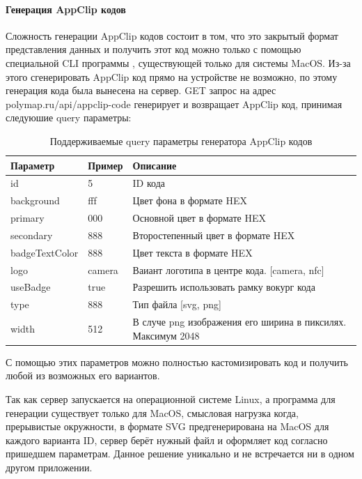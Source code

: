     \paragraph{Генерация AppClip кодов}
      Сложность генерации AppClip кодов состоит в том, что это закрытый формат представления данных и получить этот код можно только с помощью специальной CLI программы \cite{AppClipGenerator}, существующей только для системы MacOS. Из-за этого сгенерировать AppClip код прямо на устройстве не возможно, по этому генерация кода была вынесена на сервер. GET запрос на адрес polymap.ru/api/appclip-code генерирует и возвращает AppClip код, принимая следуюшие query параметры:
      \begin{center}
        \begin{xltabular}{\linewidth}{|l|p{3cm}|X|}
          \caption{Поддерживаемые query параметры генератора AppClip кодов}\\\hline
          Параметр       & Пример & Описание                                                     \\ \hline
          id             & 5      & ID кода                                                      \\ \hline
          background     & fff    & Цвет фона в формате HEX                                      \\ \hline
          primary        & 000    & Основной цвет в формате HEX                                  \\ \hline
          secondary      & 888    & Второстепенный цвет в формате HEX                            \\ \hline
          badgeTextColor & 888    & Цвет текста в формате HEX                                    \\ \hline
          logo           & camera & Ваиант логотипа в центре кода. [camera, nfc]                 \\ \hline
          useBadge       & true   & Разрешить использовать рамку вокург кода                     \\ \hline
          type           & 888    & Тип файла [svg, png]                                         \\ \hline
          width          & 512    & В случе png изображения его ширина в пиксилях. Максимум 2048 \\ \hline
        \end{xltabular}
      \end{center}


      С помощью этих параметров можно полностью кастомизировать код и получить любой из возможных его вариантов.

      Так как сервер запускается на операционной системе Linux, а программа для генерации существует только для MacOS, смысловая нагрузка когда, прерывистые окружности, в формате SVG предгенерирована на MacOS для каждого варианта ID, сервер берёт нужный файл и оформляет код согласно пришедшем параметрам. Данное решение уникально и не встречается ни в одном другом приложении.


